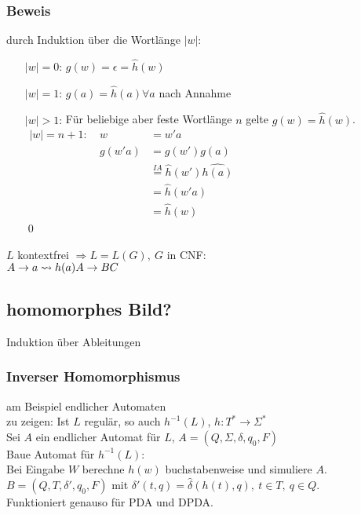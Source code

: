     \subsubsection{Beweis}
        durch Induktion über die Wortlänge $|w|$:
        \begin{itemize}
            \item[$|w|=0$:] $g(w)=\epsilon=\hat{h}(w)$
            \item[$|w|=1$:] $g(a)=\hat{h}(a)\forall a$ nach Annahme
            \item[$|w|>1$:] Für beliebige aber feste Wortlänge $n$ gelte $g(w)=\hat{h}(w)$.\\
            \begin{math}
            \begin{array}{lrl}
                |w|=n+1:\ & w&=w'a \\
                & g(w'a) &= g(w')g(a)\\
                && \overset{IA}{=} \hat{h}(w')\hat{h(a)}\\
                && = \hat{h}(w'a)\\
                &&=\hat{h}(w)
            \end{array}
            \end{math}\\\hfill\qed
        \end{itemize}
    $L$ kontextfrei $\Rightarrow L=L(G),\ G$ in CNF:\\
    $A\rightarrow a\leadsto h(a)\\ A\rightarrow BC$
    \subsection{homomorphes Bild?}
    Induktion über Ableitungen\\
    \subsubsection{Inverser Homomorphismus}
    am Beispiel endlicher Automaten\\
    zu zeigen: Ist $L$ regulär, so auch $h^{-1}(L)$, $h: T^*\rightarrow \Sigma^*$\\
    Sei $A$ ein endlicher Automat für $L$, $A=(Q,\Sigma,\delta,q_0,F)$\\
    Baue Automat für $h^{-1}(L)$:\\
    Bei Eingabe $W$ berechne $h(w)$ buchstabenweise und simuliere $A$. $B=(Q,T,\delta',q_0,F)$ mit $\delta'(t,q)=\hat{\delta}(h(t),q),\ t\in T,\ q\in Q$.\\
    Funktioniert genauso für PDA und DPDA.
